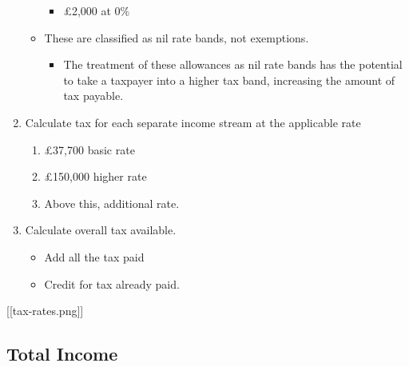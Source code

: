 \documentclass[
]{article}
\providecommand{\tightlist}{%
  \setlength{\itemsep}{0pt}\setlength{\parskip}{0pt}}
\begin{document}
\begin{enumerate}
\begin{itemize}
    \begin{itemize}
    \tightlist
    \item
      £2,000 at 0\%
    \end{itemize}
  \item
    These are classified as nil rate bands, not exemptions.

    \begin{itemize}
    \tightlist
    \item
      The treatment of these allowances as nil rate bands has the
      potential to take a taxpayer into a higher tax band, increasing
      the amount of tax payable.
    \end{itemize}
  \end{itemize}
\item
  Calculate tax for each separate income stream at the applicable rate

  \begin{enumerate}
  \def\labelenumii{\arabic{enumii}.}
  \tightlist
  \item
    £37,700 basic rate
  \item
    £150,000 higher rate
  \item
    Above this, additional rate.
  \end{enumerate}
\item
  Calculate overall tax available.

  \begin{itemize}
  \tightlist
  \item
    Add all the tax paid
  \item
    Credit for tax already paid.
  \end{itemize}
\end{enumerate}

{[}{[}tax-rates.png{]}{]}

\hypertarget{total-income}{%
\subsection{Total Income}\label{total-income}}
\end{document}
